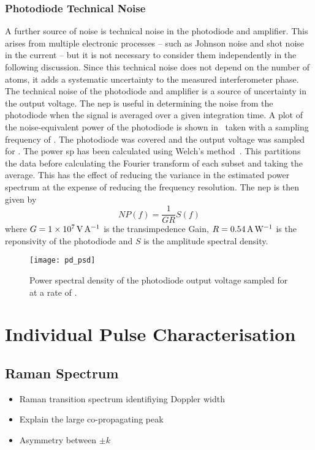 \subsubsection{Photodiode Technical Noise}
A further source of noise is technical noise in the photodiode and
amplifier. This
arises from multiple electronic processes -- such as Johnson noise and shot noise in
the current -- but it is not necessary to consider them independently
in the following discussion. Since this technical noise does not
depend on the number of atoms, it adds a systematic uncertainty to the
measured interferometer phase. 
The technical noise of the photodiode and amplifier is a source of
uncertainty in the output voltage. The \ac{nep} is
useful in determining the noise from the photodiode when the signal is
averaged over a given integration time. A plot of the noise-equivalent
power of the photodiode is shown in~ taken
with a sampling frequency of . The
photodiode was covered and the output voltage was sampled for
. The power sp has been calculated
using Welch's method~\cite{Welch1967}. This partitions the data before
calculating the Fourier transform of each subset and taking the
average. This has the effect of reducing the variance in the estimated
power spectrum at the expense of reducing the frequency resolution.
The \ac{nep} is then given by
\begin{equation}
  NP(f) = \frac{1}{G R } S(f)
  \label{eg:nep_psd}
\end{equation}
where \(G = \sivalue{1e7}{\volt\per\ampere}\) is the transimpedence Gain,
\(R = \sivalue{0.54}{\ampere\per\watt}\) is the reponsivity of the
photodiode and \(S\) is the amplitude spectral density.

\begin{figure}[htpb!]
  \centering
  \texttt{[image: pd\_psd]}
  \caption[Power spectral density]{Power spectral density of the photodiode output voltage
  sampled for  at a rate of \sivalue{\kilo\hertz}.}
  \label{fig:pd_psd}
\end{figure}
\section{Individual Pulse Characterisation} \label{sec:atomint_rabiosc}
\subsection{Raman Spectrum}
\begin{itemize}
	\item Raman transition spectrum identifiying Doppler width
	\item Explain the large co-propagating peak
	\item Asymmetry between \(\pm k\)
\end{itemize}

